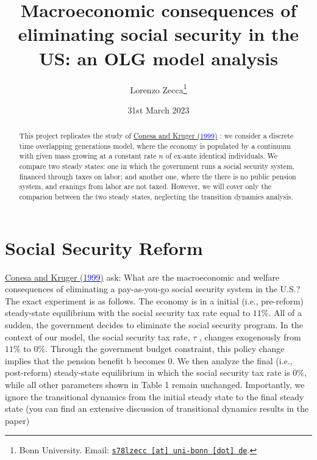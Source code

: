 \documentclass[11pt, a4paper, leqno]{article}
\begin{document}
\title{Macroeconomic consequences of eliminating social security in the US: an OLG model analysis}

\author{Lorenzo Zecca\thanks{Bonn University. Email: \href{mailto:s78lzecc@uni-bonn.de}{\nolinkurl{s78lzecc [at] uni-bonn [dot] de}}.}}

\date{
    31st March 2023
}

\maketitle


\begin{abstract}
    This project replicates the study of \hyperlink{Conesa and Kruger 1999}{Conesa and Kruger (\textcolor{blue}{1999})}
    : we consider a discrete time overlapping generations model, 
    where the economy is populated by a continuum with given mass 
    growing at a constant rate $n$ of ex-ante identical individuals.
    We compare two steady states: 
    one in which the government runs a social security system, financed 
    through taxes on labor; and another one, where the there is no public 
    pension system, and eranings from labor are not taxed. However, we will cover only 
    the comparion between the two steady states, neglecting the transition dynamics analysis.
\end{abstract}

\clearpage

\section{Social Security Reform}
\hyperlink{Conesa and Kruger 1999}{Conesa and Kruger (\textcolor{blue}{1999})} ask: What are the macroeconomic and welfare
consequences of eliminating a pay-as-you-go social security system in the
U.S.?
The exact experiment is as follows. The economy is in a initial (i.e., pre-reform) 
steady-state equilibrium with the social security tax rate equal to
$11\%$. All of a sudden, the government decides to eliminate the social security
program. In the context of our model, the social security tax rate, $\tau$ , changes
exogenously from $11\%$ to $0\%$. Through the government budget constraint, this policy
 change implies that the pension benefit b becomes 0. We
then analyze the final (i.e., post-reform) steady-state equilibrium in which
the social security tax rate is $0\%$, while all other parameters shown in Table 1 remain unchanged. Importantly, we ignore the transitional dynamics from
the initial steady state to the final steady state (you can find an extensive
discussion of transitional dynamics results in the paper)
\end{document}
